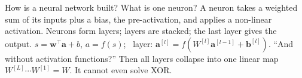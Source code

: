 \begin{qabox}[Klambauer]{\asked How is a neural network built? What is one neuron?}
\ans A neuron takes a weighted sum of its inputs plus a bias, the pre-activation, and applies a
non-linear activation. Neurons form layers; layers are stacked; the last layer gives the output.
\formula $s=\mathbf{w}^\top\mathbf{a}+b$, $a=f(s)$; \ layer: $\mathbf{a}^{[l]}=f(W^{[l]}\mathbf{a}^{[l-1]}+\mathbf{b}^{[l]})$.
\follow ``And without activation functions?'' Then all layers collapse into one linear map
$W^{[L]}\cdots W^{[1]}=W$. It cannot even solve XOR.
\end{qabox}
